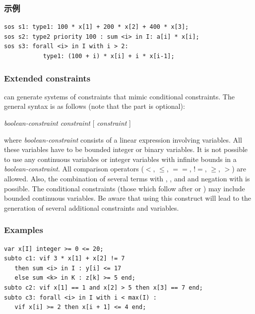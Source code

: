\subsubsection{示例}
{\small
\begin{verbatim}
sos s1: type1: 100 * x[1] + 200 * x[2] + 400 * x[3];
sos s2: type2 priority 100 : sum <i> in I: a[i] * x[i];
sos s3: forall <i> in I with i > 2:
           type1: (100 + i) * x[i] + i * x[i-1];
\end{verbatim}
}

\subsubsection{Extended constraints}
\zimpl can generate systems of constraints that
mimic conditional constraints. The general syntax is as follows (note
that the  part is optional):

\smallskip
\centerline{
 \emph{boolean-constraint}  \emph{constraint}
[  \emph{constraint} ] }

\smallskip
\noindent where \emph{boolean-constraint} consists of a linear expression involving
variables. All these variables have to be bounded integer or binary
variables. It is not possible to use any continuous variables or integer
variables with infinite bounds in a \emph{boolean-constraint}.
All comparison operators ($<$, $\le$, $==$, $!\!\!=$, $\ge$, $>$) are
allowed. Also, the combination of several terms with ,
, and  and negation with  is possible.
The conditional constraints (those which follow after  or
) may include bounded continuous variables.
Be aware that using this construct will lead to
the generation of several additional constraints and variables.

\subsubsection{Examples}
{\small
\begin{verbatim}
var x[I] integer >= 0 <= 20;
subto c1: vif 3 * x[1] + x[2] != 7
   then sum <i> in I : y[i] <= 17
   else sum <k> in K : z[k] >= 5 end;
subto c2: vif x[1] == 1 and x[2] > 5 then x[3] == 7 end;
subto c3: forall <i> in I with i < max(I) :
   vif x[i] >= 2 then x[i + 1] <= 4 end;
\end{verbatim}
}

